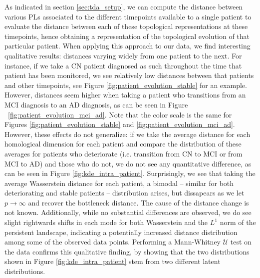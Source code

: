 \documentclass{article}
\begin{document}
As indicated in section \ref{sec:tda_setup}, we can compute the distance between
various PLs associated to the different timepoints available to a single patient
to evaluate the distance between each of these topological representations at
these timepoints, hence obtaining a representation of the topological evolution
of that particular patient. When applying this approach to our data, we find
interesting qualitative results: distances varying widely from one patient to
the next. For instance, if we take a CN patient diagnosed as such throughout the
time that patient has been monitored, we see relatively low distances between
that patients and other timepoints, see Figure
\ref{fig:patient_evolution_stable} for an example. However, distances seem
higher when taking a patient who transitions from an MCI diagnosis to an AD
diagnosis, as can be seen in Figure ~\ref{fig:patient_evolution_mci_ad}. Note
that the color scale is the same for Figures \ref{fig:patient_evolution_stable}
and \ref{fig:patient_evolution_mci_ad}. However, these effects do not
generalize: if we take the average distance for each homological dimension for
each patient and compare the distribution of these averages for patients who
deteriorate (i.e. transition from CN to MCI or from MCI to AD) and those who do
not, we do not see any quantitative difference, as can be seen in Figure
\ref{fig:kde_intra_patient}. Surprisingly, we see that taking the average
Wasserstein distance for each patient, a bimodal -- similar for both
deteriorating and stable patients -- distribution arises, but dissapears as we
let $p\to\infty$ and recover the bottleneck distance. The cause of the distance
change is not known. Additionally, while no substantial differences are
observed, we do see slight rightwards shifts in each mode for both Wasserstein
and the $L^1$ norm of the persistent landscape, indicating a potentially
increased distance distribution among some of the observed data points.
Performing a Mann-Whitney $\mathcal{U}$ test on the data confirms this
qualitative finding, by showing that the two distributions shown in Figure
\ref{fig:kde_intra_patient} stem from two different latent distributions.
\end{document}
